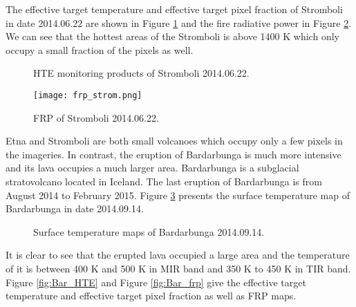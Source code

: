 \noindent The effective target temperature and effective target pixel fraction of Stromboli in date 2014.06.22 are shown in Figure \ref{fig:Strom_HTE} and the fire radiative power in Figure \ref{fig:Strom_frp}. We can see that the hottest areas of the Stromboli is above 1400 K which only occupy a small fraction of the pixels as well.\\

\begin{figure}[!htbp]
\centering
{}
\hspace{0.1in}
\caption{HTE monitoring products of Stromboli 2014.06.22.}
\label{fig:Strom_HTE}
\end{figure}

\begin{figure}[!htbp]
\centering
\texttt{[image: frp\_strom.png]}
\caption{FRP of Stromboli 2014.06.22.}
\label{fig:Strom_frp}
\end{figure}

\noindent Etna and Stromboli are both small volcanoes which occupy only a few pixels in the imageries. In contrast, the eruption of Bardarbunga is much more intensive and its lava occupies a much larger area. Bardarbunga is a subglacial stratovolcano located in Iceland. The last eruption of Bardarbunga is from August 2014 to February 2015. Figure \ref{fig:Bar_sur_tem} presents the surface temperature map of Bardarbunga in date 2014.09.14.\\

\begin{figure}
\centering
{}
\hspace{0.1in}
\caption{Surface temperature maps of Bardarbunga 2014.09.14.}
\label{fig:Bar_sur_tem}
\end{figure}

\noindent It is clear to see that the erupted lava occupied a large area and the temperature of it is between 400 K and 500 K in MIR band and 350 K to 450 K in TIR band. Figure \ref{fig:Bar_HTE} and Figure \ref{fig:Bar_frp} give the effective target temperature and effective target pixel fraction as well as FRP maps.\\

